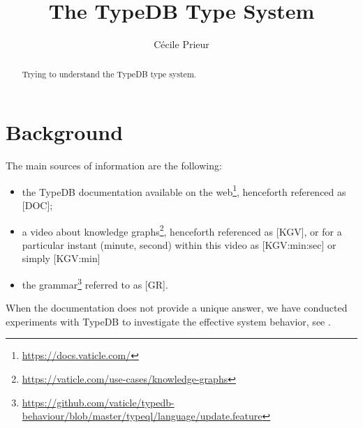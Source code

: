 \documentclass{article}
\begin{document}
\title{The TypeDB Type System}

\author{
Cécile Prieur
}
\maketitle

\begin{abstract}
Trying to understand the TypeDB type system.
\end{abstract}



\tableofcontents

\section{Background}\label{sec:background}

The main sources of information are the following:

\begin{itemize}
\item the TypeDB documentation available on the
  web\footnote{\url{https://docs.vaticle.com/}},
  henceforth referenced as [DOC];
\item a video about knowledge
  graphs\footnote{\url{https://vaticle.com/use-cases/knowledge-graphs}},
  henceforth referenced as [KGV], or for a particular instant (minute, second)
  within this video as [KGV:min:sec] or simply [KGV:min]
\item the
  grammar\footnote{\url{https://github.com/vaticle/typedb-behaviour/blob/master/typeql/language/update.feature}}
  referred to as [GR].
\end{itemize}

When the documentation does not
provide a unique answer, we have conducted experiments with TypeDB to
investigate the effective system behavior, see .


\end{document}
